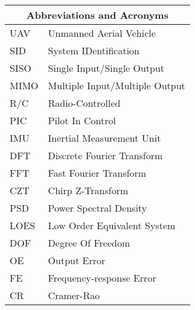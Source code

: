 \begin{center}
\tabletail{\hline}
	\begin{tabular}{    p{3.0cm}  p{9cm} }
	\multicolumn{2}{c}{\textbf{Abbreviations and Acronyms}} \\ \hline \hline
         UAV	&	Unmanned Aerial Vehicle\\
         SID   	&	System IDentification \\
         SISO  	&	Single Input/Single Output\\
         MIMO  	&	Multiple Input/Multiple Output\\
         R/C   	&	Radio-Controlled\\
         PIC	&	Pilot In Control \\
         IMU	&	Inertial Measurement Unit\\
         DFT   	&	Discrete Fourier Transform\\
         FFT   	&	Fast Fourier Transform\\
         CZT   	&	Chirp Z-Transform\\
         PSD   	&	Power Spectral Density\\
         LOES  	&	Low Order Equivalent System\\
         DOF   	&	Degree Of Freedom\\
      	 OE    	&	Output Error\\
         FE   	&	Frequency-response Error\\
         CR   	&	Cramer-Rao 
	\end{tabular}%
\end{center}





